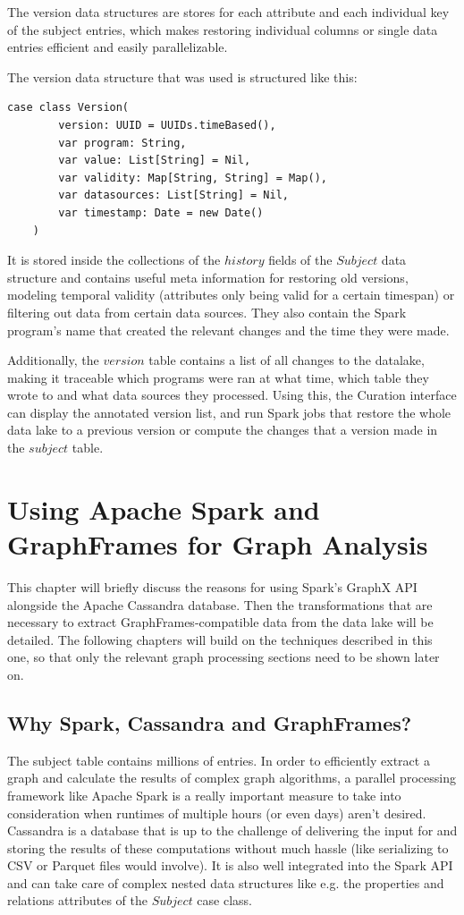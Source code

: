 \documentclass[
        a4paper,     %
        titlepage,   %
        oneside,     %
        parskip      %
        ]{scrartcl}  %
\begin{document}
    The version data structures are stores for each attribute and each individual
    key of the subject entries, which makes restoring individual columns or single
    data entries efficient and easily parallelizable.

    The version data structure that was used is structured like this:
    \begin{lstlisting}[style=scalaStyle,caption=Version]
    case class Version(
    	version: UUID = UUIDs.timeBased(),
    	var program: String,
    	var value: List[String] = Nil,
    	var validity: Map[String, String] = Map(),
    	var datasources: List[String] = Nil,
    	var timestamp: Date = new Date()
    )
    \end{lstlisting}

    It is stored inside the collections of the $history$ fields of the $Subject$
    data structure and contains useful meta information for restoring old versions,
    modeling temporal validity (attributes only being valid for a certain timespan)
    or filtering out data from certain data sources. They also contain the Spark
    program's name that created the relevant changes and the time they were made.

    Additionally, the $version$ table contains a list of all changes to the datalake,
    making it traceable which programs were ran at what time, which table they wrote
    to and what data sources they processed. Using this, the Curation interface
    can display the annotated version list, and run Spark jobs that restore the
    whole data lake to a previous version or compute the changes that a version
    made in the $subject$ table.
    \pagebreak

  \section{Using Apache Spark and GraphFrames for Graph Analysis}
  This chapter will briefly discuss the reasons for using Spark's GraphX API
  alongside the Apache Cassandra database. Then the transformations that are
  necessary to extract GraphFrames-compatible data from the data lake will be detailed.
  The following chapters will build on the techniques described in this one, so
  that only the relevant graph processing sections need to be shown later on.

    \subsection{Why Spark, Cassandra and GraphFrames?}
    The subject table contains millions of entries. In order to efficiently extract
    a graph and calculate the results of complex graph algorithms, a parallel processing
    framework like Apache Spark is a really important measure to take into consideration when runtimes
    of multiple hours (or even days) aren't desired. Cassandra is a database that
    is up to the challenge of delivering the input for and storing the results of
    these computations without much hassle (like serializing to CSV or Parquet files would involve).
    It is also well integrated into the Spark API and can take care of complex nested
    data structures like e.g. the properties and relations attributes of the $Subject$
    case class.
\end{document}
